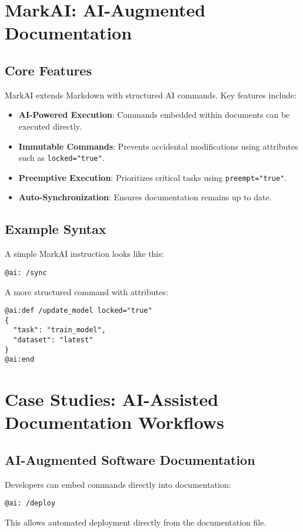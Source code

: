 \documentclass{article}
\begin{document}
\section{MarkAI: AI-Augmented Documentation}
\subsection{Core Features}
MarkAI extends Markdown with structured AI commands. Key features include:
\begin{itemize}
    \item \textbf{AI-Powered Execution}: Commands embedded within documents can be executed directly.
    \item \textbf{Immutable Commands}: Prevents accidental modifications using attributes such as \texttt{locked="true"}.
    \item \textbf{Preemptive Execution}: Prioritizes critical tasks using \texttt{preempt="true"}.
    \item \textbf{Auto-Synchronization}: Ensures documentation remains up to date.
\end{itemize}

\subsection{Example Syntax}
A simple MarkAI instruction looks like this:
\begin{lstlisting}
@ai: /sync
\end{lstlisting}

A more structured command with attributes:
\begin{lstlisting}
@ai:def /update_model locked="true"
{
  "task": "train_model",
  "dataset": "latest"
}
@ai:end
\end{lstlisting}

\section{Case Studies: AI-Assisted Documentation Workflows}
\subsection{AI-Augmented Software Documentation}
Developers can embed commands directly into documentation:
\begin{lstlisting}
@ai: /deploy
\end{lstlisting}

This allows automated deployment directly from the documentation file.
\end{document}
